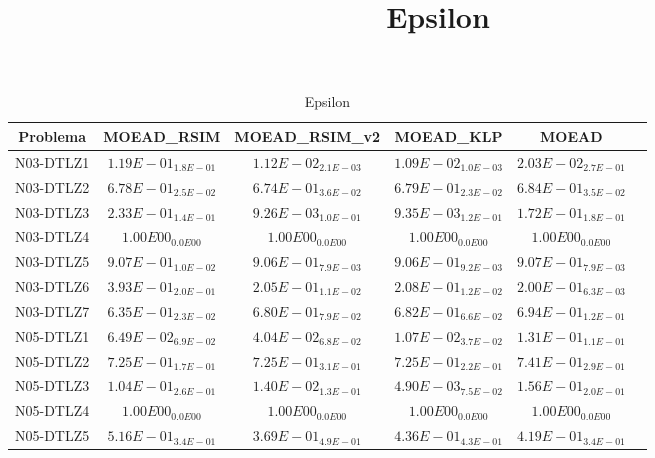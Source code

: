 \documentclass{article}
\title{Epsilon}
\author{}
\begin{document}
\maketitle
\begin{table*}[ht!]
\scriptsize
\caption{Epsilon}
\centering\begin{tabular}{|c||c||c||c||c||c|} \hline
Problema &MOEAD_RSIM &MOEAD_RSIM_v2 &MOEAD_KLP &MOEAD\\\hline
N03-DTLZ1 &$1.19E-01_{1.8E-01}$ &\cellcolor{gray25}$1.12E-02_{2.1E-03}$ &\cellcolor{gray95}$1.09E-02_{1.0E-03}$ &$2.03E-02_{2.7E-01}$\\ 
\hline
N03-DTLZ2 &\cellcolor{gray25}$6.78E-01_{2.5E-02}$ &\cellcolor{gray95}$6.74E-01_{3.6E-02}$ &$6.79E-01_{2.3E-02}$ &$6.84E-01_{3.5E-02}$\\ 
\hline
N03-DTLZ3 &$2.33E-01_{1.4E-01}$ &\cellcolor{gray95}$9.26E-03_{1.0E-01}$ &\cellcolor{gray25}$9.35E-03_{1.2E-01}$ &$1.72E-01_{1.8E-01}$\\ 
\hline
N03-DTLZ4 &\cellcolor{gray95}$1.00E00_{0.0E00}$ &\cellcolor{gray25}$1.00E00_{0.0E00}$ &$1.00E00_{0.0E00}$ &$1.00E00_{0.0E00}$\\ 
\hline
N03-DTLZ5 &$9.07E-01_{1.0E-02}$ &\cellcolor{gray95}$9.06E-01_{7.9E-03}$ &\cellcolor{gray25}$9.06E-01_{9.2E-03}$ &$9.07E-01_{7.9E-03}$\\ 
\hline
N03-DTLZ6 &$3.93E-01_{2.0E-01}$ &\cellcolor{gray25}$2.05E-01_{1.1E-02}$ &$2.08E-01_{1.2E-02}$ &\cellcolor{gray95}$2.00E-01_{6.3E-03}$\\ 
\hline
N03-DTLZ7 &\cellcolor{gray95}$6.35E-01_{2.3E-02}$ &\cellcolor{gray25}$6.80E-01_{7.9E-02}$ &$6.82E-01_{6.6E-02}$ &$6.94E-01_{1.2E-01}$\\ 
\hline
N05-DTLZ1 &$6.49E-02_{6.9E-02}$ &\cellcolor{gray25}$4.04E-02_{6.8E-02}$ &\cellcolor{gray95}$1.07E-02_{3.7E-02}$ &$1.31E-01_{1.1E-01}$\\ 
\hline
N05-DTLZ2 &\cellcolor{gray95}$7.25E-01_{1.7E-01}$ &$7.25E-01_{3.1E-01}$ &\cellcolor{gray25}$7.25E-01_{2.2E-01}$ &$7.41E-01_{2.9E-01}$\\ 
\hline
N05-DTLZ3 &$1.04E-01_{2.6E-01}$ &\cellcolor{gray25}$1.40E-02_{1.3E-01}$ &\cellcolor{gray95}$4.90E-03_{7.5E-02}$ &$1.56E-01_{2.0E-01}$\\ 
\hline
N05-DTLZ4 &\cellcolor{gray95}$1.00E00_{0.0E00}$ &\cellcolor{gray25}$1.00E00_{0.0E00}$ &$1.00E00_{0.0E00}$ &$1.00E00_{0.0E00}$\\ 
\hline
N05-DTLZ5 &$5.16E-01_{3.4E-01}$ &\cellcolor{gray95}$3.69E-01_{4.9E-01}$ &$4.36E-01_{4.3E-01}$ &\cellcolor{gray25}$4.19E-01_{3.4E-01}$\\ 

\end{tabular}
\end{table*}
\end{document}
